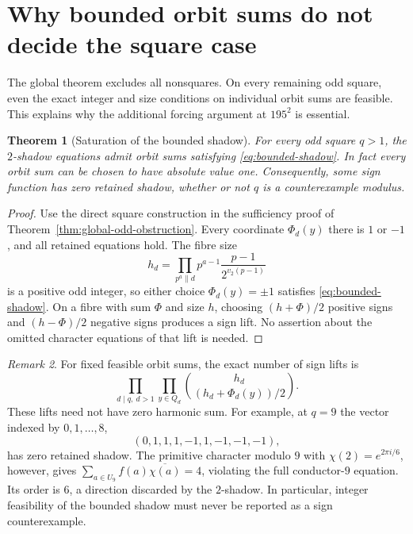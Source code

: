 \documentclass[11pt]{amsart}
\newtheorem{theorem}{Theorem}[section]
\theoremstyle{definition}
\theoremstyle{remark}
\newtheorem{remark}[theorem]{Remark}
\numberwithin{equation}{section}
\begin{document}
\section{Why bounded orbit sums do not decide the square case}
\label{sec:bounded}

The global theorem excludes all nonsquares. On every remaining odd square,
even the exact integer and size conditions on individual orbit sums are
feasible. This explains why the additional forcing argument at $195^2$
is essential.

\begin{theorem}[Saturation of the bounded shadow]
\label{thm:bounded-squares}
For every odd square $q>1$, the $2$-shadow equations admit orbit sums
satisfying \eqref{eq:bounded-shadow}. In fact every orbit sum can be
chosen to have absolute value one. Consequently, some sign function
has zero retained shadow, whether or not $q$ is a counterexample modulus.
\end{theorem}
\begin{proof}
Use the direct square construction in the sufficiency proof of
Theorem~\ref{thm:global-odd-obstruction}. Every coordinate $\Phi_d(y)$
there is $1$ or $-1$, and all retained equations hold. The fibre size
\[
 h_d=\prod_{p^a\parallel d}p^{a-1}
              \frac{p-1}{2^{v_2(p-1)}}
\]
is a positive odd integer, so either choice $\Phi_d(y)=\pm1$ satisfies
\eqref{eq:bounded-shadow}. On a fibre with sum $\Phi$ and size $h$,
choosing $(h+\Phi)/2$ positive signs and $(h-\Phi)/2$ negative signs
produces a sign lift. No assertion about the omitted character equations
of that lift is needed.
\end{proof}

\begin{remark}
For fixed feasible orbit sums, the exact number of sign lifts is
\[
 \prod_{d\mid q,\ d>1}\prod_{y\in Q_d}
 \binom{h_d}{(h_d+\Phi_d(y))/2}.
\]
These lifts need not have zero harmonic sum. For example, at $q=9$ the
vector indexed by $0,1,\ldots,8$,
\[
 (0,1,1,1,-1,1,-1,-1,-1),
\]
has zero retained shadow. The primitive character modulo $9$ with
$\chi(2)=e^{2\pi i/6}$, however, gives
$\sum_{a\in U_9}f(a)\overline{\chi(a)}=4$, violating the full
conductor-$9$ equation. Its order is $6$, a direction discarded by the
$2$-shadow. In particular, integer feasibility of the bounded shadow
must never be reported as a sign counterexample.
\end{remark}


\end{document}
